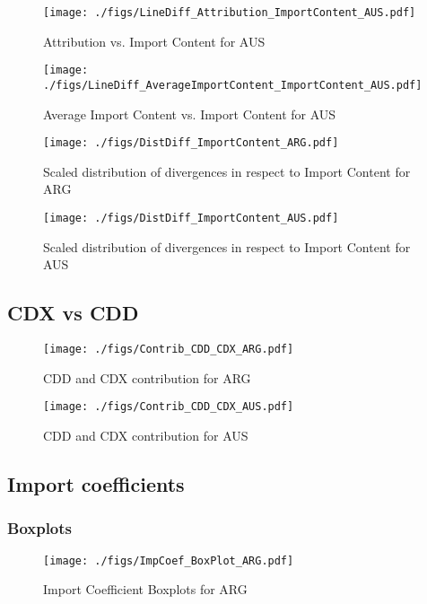 \documentclass[11pt]{article}
\begin{document}
\begin{figure}[H]
\centering
\texttt{[image: ./figs/LineDiff\_Attribution\_ImportContent\_AUS.pdf]}
\caption{Attribution vs. Import Content for AUS}
\end{figure}

\begin{figure}[H]
\centering
\texttt{[image: ./figs/LineDiff\_AverageImportContent\_ImportContent\_AUS.pdf]}
\caption{Average Import Content vs. Import Content for AUS}
\end{figure}
\begin{figure}[H]
\centering
\texttt{[image: ./figs/DistDiff\_ImportContent\_ARG.pdf]}
\caption{Scaled distribution of divergences in respect to Import Content for ARG}
\end{figure}

\begin{figure}[H]
\centering
\texttt{[image: ./figs/DistDiff\_ImportContent\_AUS.pdf]}
\caption{Scaled distribution of divergences in respect to Import Content for AUS}
\end{figure}
\subsection{CDX vs CDD}
\label{sec:orgcc9614d}


\begin{figure}[t]
\centering
\texttt{[image: ./figs/Contrib\_CDD\_CDX\_ARG.pdf]}
\caption{CDD and CDX contribution for ARG}
\end{figure}

\begin{figure}[t]
\centering
\texttt{[image: ./figs/Contrib\_CDD\_CDX\_AUS.pdf]}
\caption{CDD and CDX contribution for AUS}
\end{figure}
\subsection{Import coefficients}
\label{sec:org510ad7a}

\subsubsection{Boxplots}
\label{sec:org955eb9b}


\begin{figure}[t]
\centering
\texttt{[image: ./figs/ImpCoef\_BoxPlot\_ARG.pdf]}
\caption{Import Coefficient Boxplots for ARG}
\end{figure}
\end{document}
